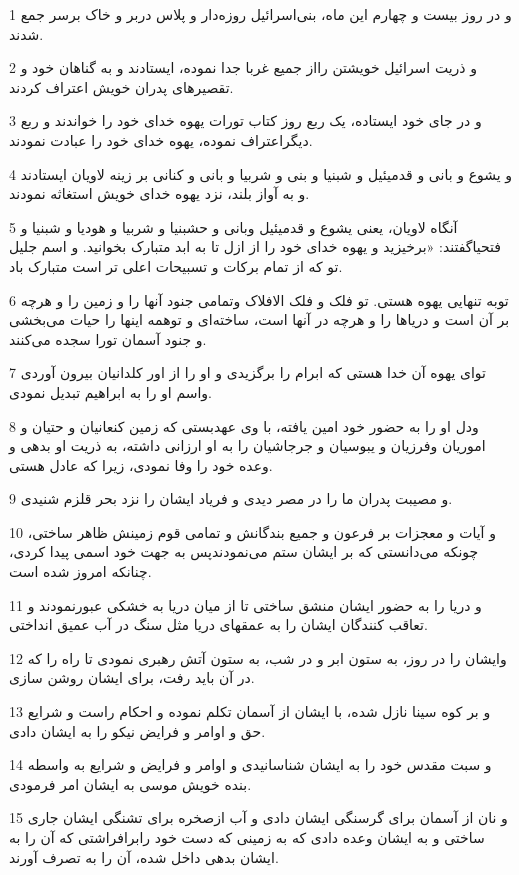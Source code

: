 \par 1 و در روز بیست و چهارم این ماه، بنی‌اسرائیل روزه‌دار و پلاس دربر و خاک برسر جمع شدند.
\par 2 و ذریت اسرائیل خویشتن رااز جمیع غربا جدا نموده، ایستادند و به گناهان خود و تقصیرهای پدران خویش اعتراف کردند.
\par 3 و در جای خود ایستاده، یک ربع روز کتاب تورات یهوه خدای خود را خواندند و ربع دیگراعتراف نموده، یهوه خدای خود را عبادت نمودند.
\par 4 و یشوع و بانی و قدمیئیل و شبنیا و بنی و شربیا و بانی و کنانی بر زینه لاویان ایستادند و به آواز بلند، نزد یهوه خدای خویش استغاثه نمودند.
\par 5 آنگاه لاویان، یعنی یشوع و قدمیئیل وبانی و حشبنیا و شربیا و هودیا و شبنیا و فتحیاگفتند: «برخیزید و یهوه خدای خود را از ازل تا به ابد متبارک بخوانید. و اسم جلیل تو که از تمام برکات و تسبیحات اعلی تر است متبارک باد.
\par 6 توبه تنهایی یهوه هستی. تو فلک و فلک الافلاک وتمامی جنود آنها را و زمین را و هر‌چه بر آن است و دریاها را و هر‌چه در آنها است، ساخته‌ای و توهمه اینها را حیات می‌بخشی و جنود آسمان تورا سجده می‌کنند.
\par 7 تو‌ای یهوه آن خدا هستی که ابرام را برگزیدی و او را از اور کلدانیان بیرون آوردی واسم او را به ابراهیم تبدیل نمودی.
\par 8 ودل او را به حضور خود امین یافته، با وی عهدبستی که زمین کنعانیان و حتیان و اموریان وفرزیان و یبوسیان و جرجاشیان را به او ارزانی داشته، به ذریت او بدهی و وعده خود را وفا نمودی، زیرا که عادل هستی.
\par 9 و مصیبت پدران ما را در مصر دیدی و فریاد ایشان را نزد بحر قلزم شنیدی.
\par 10 و آیات و معجزات بر فرعون و جمیع بندگانش و تمامی قوم زمینش ظاهر ساختی، چونکه می‌دانستی که بر ایشان ستم می‌نمودندپس به جهت خود اسمی پیدا کردی، چنانکه امروز شده است.
\par 11 و دریا را به حضور ایشان منشق ساختی تا از میان دریا به خشکی عبورنمودند و تعاقب کنندگان ایشان را به عمقهای دریا مثل سنگ در آب عمیق انداختی.
\par 12 وایشان را در روز، به ستون ابر و در شب، به ستون آتش رهبری نمودی تا راه را که در آن باید رفت، برای ایشان روشن سازی.
\par 13 و بر کوه سینا نازل شده، با ایشان از آسمان تکلم نموده و احکام راست و شرایع حق و اوامر و فرایض نیکو را به ایشان دادی.
\par 14 و سبت مقدس خود را به ایشان شناسانیدی و اوامر و فرایض و شرایع به واسطه بنده خویش موسی به ایشان امر فرمودی.
\par 15 و نان از آسمان برای گرسنگی ایشان دادی و آب ازصخره برای تشنگی ایشان جاری ساختی و به ایشان وعده دادی که به زمینی که دست خود رابرافراشتی که آن را به ایشان بدهی داخل شده، آن را به تصرف آورند.
